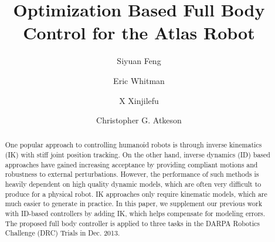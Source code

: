 \documentclass{ws-ijhr}
\begin{document}

%
\catchline{}{}{}{}{}
%

\title{Optimization Based Full Body Control for the Atlas Robot}

\author{Siyuan Feng}
\address{The Robotics Institute, Carnegie Mellon 
  University, 5000 Forbes Avenue, Pittsburgh, PA 15213, USA \\
	sfeng@cs.cmu.edu}

\author{Eric Whitman}
\address{
	Boston Dynamics / Google, 78 Fourth Avenue, Waltham, MA 02451, USA \\
	ewhitman@bostondynamics.com}

\author{X Xinjilefu}
\address{The Robotics Institute, Carnegie Mellon 
  University, 5000 Forbes Avenue, Pittsburgh, PA 15213, USA \\
	xxinjile@andrew.cmu.edu} 

\author{Christopher G. Atkeson}
\address{The Robotics Institute, Carnegie Mellon 
  University, 5000 Forbes Avenue, Pittsburgh, PA 15213, USA \\
	cga@cs.cmu.edu} 

\maketitle

\begin{history}
\end{history}

\begin{abstract}
One popular approach to controlling humanoid robots is through inverse kinematics 
(IK) with stiff joint position tracking. On the other hand, inverse dynamics 
(ID) based approaches have gained increasing acceptance by providing compliant 
motions and robustness to external perturbations. However, the performance of 
such methods is heavily dependent on high quality dynamic models, which are 
often very difficult to produce for a physical robot. IK approaches only 
require kinematic models, which are much easier to generate in practice. In this 
paper, we supplement our previous work with ID-based controllers by adding IK, 
which helps compensate for modeling errors. The proposed full body controller 
is applied to three tasks in the DARPA Robotics Challenge (DRC) Trials in Dec. 
2013.  
\end{abstract}
\end{document}
